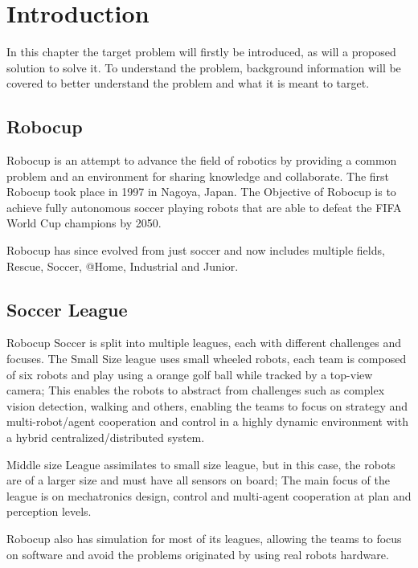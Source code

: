 \chapter{Introduction}
In this chapter the target problem will firstly be introduced, as will a proposed solution to solve it. To understand the problem, 
background information will be covered to better understand the problem and what it is meant to target.

    \section{Robocup}
    Robocup is an attempt to advance the field of robotics by providing a common problem and an environment for sharing knowledge and collaborate.
    The first Robocup took place in 1997 in Nagoya, Japan. The Objective of Robocup is to achieve fully autonomous soccer playing robots that are able to defeat the FIFA World Cup champions by 2050. 

    Robocup has since evolved from just soccer and now includes multiple fields, Rescue, Soccer, @Home, Industrial and Junior.
    \cite{robocup}

    \section{Soccer League}
    Robocup Soccer is split into multiple leagues, each with different challenges and focuses. The Small Size league uses small wheeled robots, 
    each team is composed of six robots and play using a orange golf ball while tracked by a top-view camera;
    This enables the robots to abstract from challenges such as complex vision detection, 
    walking and others, enabling the teams to focus on strategy and multi-robot/agent cooperation and 
    control in a highly dynamic environment with a hybrid centralized/distributed system. 

    Middle size League assimilates to small size league, but in this case, the robots are of a larger size and must have all sensors on board; 
    The main focus of the league is on mechatronics design, control and multi-agent cooperation at plan and perception levels.

    Robocup also has simulation for most of its leagues, allowing the teams to focus on software and avoid the problems originated by using real robots hardware.

